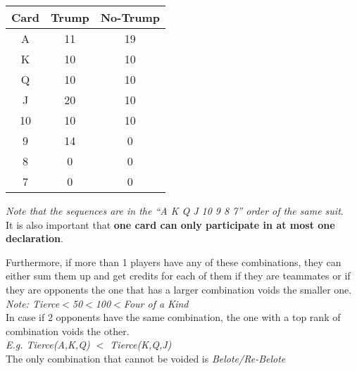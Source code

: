 \begin{center}
    \begin{tabular}{|c|c|c|}
        \hline
        \textbf{Card} & \textbf{Trump}  & \textbf{No-Trump}\\
        \hline
        A & 11 & 19\\
        \hline
        K & 10 & 10\\
        \hline
        Q & 10  & 10\\
        \hline
        J & 20 & 10\\
        \hline
        10 & 10 & 10\\
        \hline
        9 & 14 & 0\\
        \hline
        8 & 0 & 0\\
        \hline
        7 & 0 & 0\\
        \hline
    \end{tabular}
\end{center}
\textit{Note that the sequences are in the ``A K Q J 10 9 8 7'' order of the same suit}.\\
It is also important that \textbf{one card can only participate in at most one declaration}.

Furthermore, if more than 1 players have any of these combinations, they can either sum them up and get credits for each of them if they are teammates or if they are opponents the one that has a larger combination voids the smaller one.\\
\textit{Note: Tierce$<$50$<$100$<$Four of a Kind}\\
In case if 2 opponents have the same combination, the one with a top rank of combination voids the other.\\
\textit{E.g. Tierce(A,K,Q) $<$ Tierce(K,Q,J)}\\
The only combination that cannot be voided is \textit{Belote/Re-Belote}

